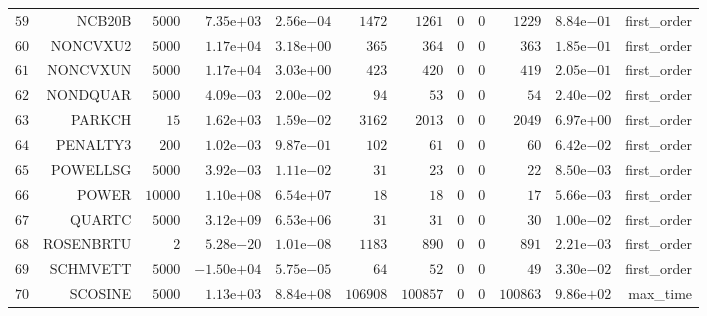 \begin{longtable}{rrrrrrrrrrrr}
  \(    59\) & NCB20B & \(  5000\) & \( 7.35\)e\(+03\) & \( 2.56\)e\(-04\) & \(  1472\) & \(  1261\) & \(     0\) & \(     0\) & \(  1229\) & \( 8.84\)e\(-01\) & first\_order \\
  \(    60\) & NONCVXU2 & \(  5000\) & \( 1.17\)e\(+04\) & \( 3.18\)e\(+00\) & \(   365\) & \(   364\) & \(     0\) & \(     0\) & \(   363\) & \( 1.85\)e\(-01\) & first\_order \\
  \(    61\) & NONCVXUN & \(  5000\) & \( 1.17\)e\(+04\) & \( 3.03\)e\(+00\) & \(   423\) & \(   420\) & \(     0\) & \(     0\) & \(   419\) & \( 2.05\)e\(-01\) & first\_order \\
  \(    62\) & NONDQUAR & \(  5000\) & \( 4.09\)e\(-03\) & \( 2.00\)e\(-02\) & \(    94\) & \(    53\) & \(     0\) & \(     0\) & \(    54\) & \( 2.40\)e\(-02\) & first\_order \\
  \(    63\) & PARKCH & \(    15\) & \( 1.62\)e\(+03\) & \( 1.59\)e\(-02\) & \(  3162\) & \(  2013\) & \(     0\) & \(     0\) & \(  2049\) & \( 6.97\)e\(+00\) & first\_order \\
  \(    64\) & PENALTY3 & \(   200\) & \( 1.02\)e\(-03\) & \( 9.87\)e\(-01\) & \(   102\) & \(    61\) & \(     0\) & \(     0\) & \(    60\) & \( 6.42\)e\(-02\) & first\_order \\
  \(    65\) & POWELLSG & \(  5000\) & \( 3.92\)e\(-03\) & \( 1.11\)e\(-02\) & \(    31\) & \(    23\) & \(     0\) & \(     0\) & \(    22\) & \( 8.50\)e\(-03\) & first\_order \\
  \(    66\) & POWER & \( 10000\) & \( 1.10\)e\(+08\) & \( 6.54\)e\(+07\) & \(    18\) & \(    18\) & \(     0\) & \(     0\) & \(    17\) & \( 5.66\)e\(-03\) & first\_order \\
  \(    67\) & QUARTC & \(  5000\) & \( 3.12\)e\(+09\) & \( 6.53\)e\(+06\) & \(    31\) & \(    31\) & \(     0\) & \(     0\) & \(    30\) & \( 1.00\)e\(-02\) & first\_order \\
  \(    68\) & ROSENBRTU & \(     2\) & \( 5.28\)e\(-20\) & \( 1.01\)e\(-08\) & \(  1183\) & \(   890\) & \(     0\) & \(     0\) & \(   891\) & \( 2.21\)e\(-03\) & first\_order \\
  \(    69\) & SCHMVETT & \(  5000\) & \(-1.50\)e\(+04\) & \( 5.75\)e\(-05\) & \(    64\) & \(    52\) & \(     0\) & \(     0\) & \(    49\) & \( 3.30\)e\(-02\) & first\_order \\
  \(    70\) & SCOSINE & \(  5000\) & \( 1.13\)e\(+03\) & \( 8.84\)e\(+08\) & \(106908\) & \(100857\) & \(     0\) & \(     0\) & \(100863\) & \( 9.86\)e\(+02\) & max\_time \\

\end{longtable}
